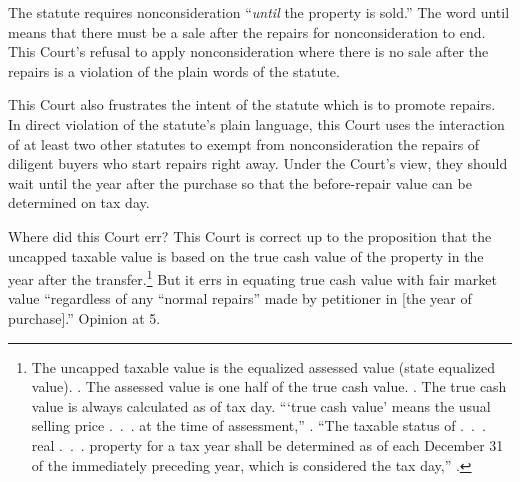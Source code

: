\documentclass[12pt,\documentclassflag]{michiganCourtOfAppealsBrief}
\begin{document}
The statute requires nonconsideration ``\emph{until} the property is sold.'' The word until means that there must be a sale after the repairs for nonconsideration to end. This Court's refusal to apply nonconsideration where there is no sale after the repairs is a violation of the plain words of the statute.

This Court also frustrates the intent of the statute which is to promote repairs.
In direct violation of the statute's plain language, this Court uses the interaction of at least two other statutes to exempt from nonconsideration the repairs of diligent buyers who start repairs right away.
Under the Court's view, they should wait until the year after the purchase so that the before-repair value can be determined on tax day.


% 


Where did this Court err? This Court is correct up to the proposition 
that the uncapped taxable value is based on the true cash value of the property in the year after the transfer.\footnote{The uncapped taxable value is the equalized assessed value (state equalized value). \cite{MCL 211.27a(3)}. The assessed value is one half of the true cash value. \cite{MCL 211.27a(1)}. The true cash value is always calculated as of tax day. ```true cash value' means the usual selling price .~.~. at the time of assessment,'' \cite{MCL 211.27(1)}. ``The taxable status of .~.~. real .~.~. property for a tax year shall be determined as of each December 31 of the immediately preceding year, which is considered the tax day,'' \cite{MCL 211.2(2)}.}
But it errs in equating true cash value with fair market value ``regardless of any ``normal repairs'' made by petitioner in [the year of purchase].'' Opinion at 5.
\end{document}
